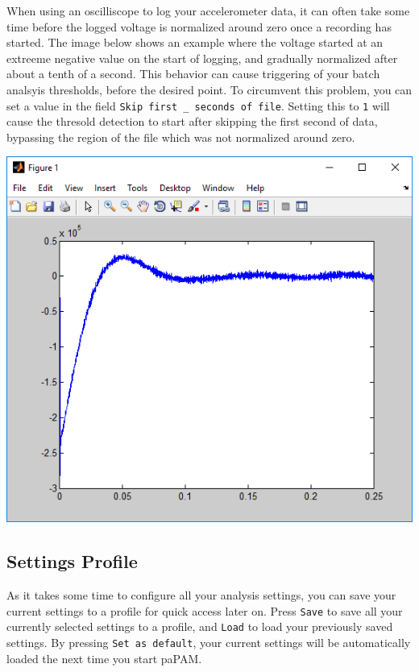 \documentclass[11pt]{report}
\begin{document}
When using an oscilliscope to log your accelerometer data, it can often take some time before the logged voltage is normalized around zero once a recording has started.
The image below shows an example where the voltage started at an extreeme negative value on the start of logging, and gradually normalized after about a tenth of a second.
This behavior can cause triggering of your batch analsyis thresholds, before the desired point.
To circumvent this problem, you can set a value in the field \texttt{Skip first \_ seconds of file}.
Setting this to \texttt{1} will cause the thresold detection to start after skipping the first second of data, bypassing the region of the file which was not normalized around zero.

\includegraphics[scale=0.6,clip = true,trim = 0 0 0 0]{14.png}\\

\subsection{Settings Profile}
As it takes some time to configure all your analysis settings, you can save your current settings to a profile for quick access later on.  Press \texttt{Save} to save all your currently selected settings to a profile, and \texttt{Load} to load your previously saved settings.  By pressing \texttt{Set as default}, your current settings will be automatically loaded the next time you start paPAM.
\end{document}

